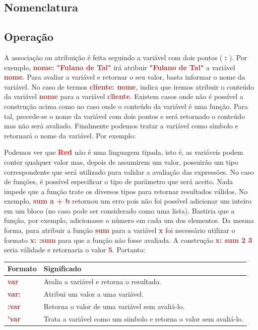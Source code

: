 \documentclass[12pt,a4paper]{article}
\newcommand{\incss}[1]{
  \ttfamily\small
  \begin{shaded}
    \VerbatimInput{./fragmentos/#1.ss}
  \end{shaded}
  \normalfont
}
\newcommand{\Red}{\textbf{\textcolor{red}{Red }}}
\newcommand{\codigo}[1]{\ttfamily\small\textcolor{Brown}{\textbf{#1}}\normalfont}
\begin{document}
\subsection{Nomenclatura}

\subsection{Operação}

A associação ou atribuição é feita seguindo a variável com dois pontos (
\textbf{:} ). Por exemplo, \codigo{nome: "Fulano de Tal"} irá atribuir
\codigo{"Fulano de Tal"} a variável \codigo{nome}. Para avaliar a variável e
retornar o seu valor, basta informar o nome da variável. No caso de termos 
\codigo{cliente: nome}, indica que iremos atribuir o conteúdo da variável
\codigo{nome} para a variável \codigo{cliente}. Existem casos onde não é
possível a construção acima como no caso onde o conteúdo da variável é uma
função. Para tal, precede-se o nome da variável com dois pontos e será retornado
o conteúdo mas não será avaliado. Finalmente podemos tratar a variável como
símbolo e retornará o nome da variável. Por exemplo: 

\incss{repl-var}

Podemos ver que \Red não é uma linguagem tipada, isto é, as variáveis podem
conter qualquer valor mas, depois de assumirem um valor, possuirão um tipo
correspondente que será utilizado para validar a avaliação das expressões. No
caso de funções, é possível especificar o tipo de parâmetro que será aceito.
Nada impede que a função trate os diversos tipos para retornar resultados
válidos. No exemplo, \codigo{sum a + b} retornou um erro pois não foi possível
adicionar um inteiro em um bloco (no caso pode ser considerado como uma lista).
Bastiria que a função, por exemplo, adicionasse o número em cada um dos
elementos. Da mesma forma, para atribuir a função \codigo{sum} para a variável
\codigo{x} foi necessário utilizar o formato \codigo{x: :sum} para que a função
não fosse avaliada. A construção \codigo{x: sum 2 3} seria válidade e retornaria
o valor \codigo{5}. Portanto:

\begin{center}
\begin{tabular}{|l|l|}
\hline
\textbf{Formato} & \textbf{Significado} \\
\hline
\hline
\codigo{var} & Avalia a variável e retorna o resultado. \\
\hline
\codigo{var:} & Atribui um valor a uma variável. \\
\hline
\codigo{:var} & Retorna o valor de uma variável sem avaliá-lo.\\
\hline
\codigo{'var} & Trata a variável como um simbolo e retorna o valor sem avaliá-lo.\\
\hline
\end{tabular}
\end{center}
\end{document}
